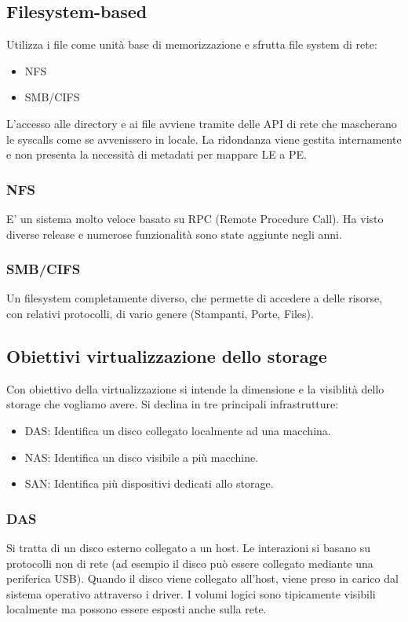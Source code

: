 \documentclass{article}
\begin{document}
		\subsection{Filesystem-based}
		Utilizza i file come unità base di memorizzazione e sfrutta file system di rete:
		\begin{itemize}
		    \item NFS
		    \item SMB/CIFS
		\end{itemize}
		L'accesso alle directory e ai file avviene tramite delle API di rete che mascherano le syscalls come se avvenissero in locale. La ridondanza viene gestita internamente e non presenta la necessità di metadati per mappare LE a PE.
		
		\subsubsection{NFS}
		E' un sistema molto veloce basato su RPC (Remote Procedure Call). Ha visto diverse release e numerose funzionalità sono state aggiunte negli anni.
		
		\subsubsection{SMB/CIFS}
		Un filesystem completamente diverso, che permette di accedere a delle risorse, con relativi protocolli, di vario genere (Stampanti, Porte, Files).
		
		\subsection{Obiettivi virtualizzazione dello storage}
		Con obiettivo della virtualizzazione si intende la dimensione e la visiblità dello storage che vogliamo avere. Si declina in tre principali infrastrutture:
		\begin{itemize}
		    \item DAS: Identifica un disco collegato localmente ad una macchina.
		    \item NAS: Identifica un disco visibile a più macchine.
		    \item SAN: Identifica più dispositivi dedicati allo storage.
		\end{itemize}
		\subsubsection{DAS}
		Si tratta di un disco esterno collegato a un host. Le interazioni si basano su protocolli non di rete (ad esempio il disco può essere collegato mediante una periferica USB).
		Quando il disco viene collegato all'host, viene preso in carico dal sistema operativo attraverso i driver. I volumi logici sono tipicamente visibili localmente ma possono essere esposti anche sulla rete. 
\end{document}
